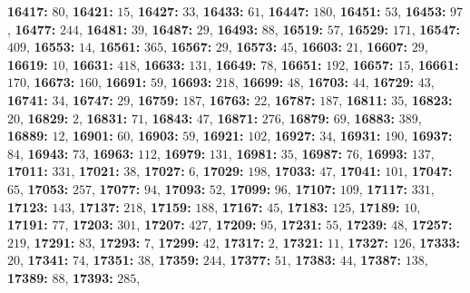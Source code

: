 \textsf{\bfseries 16417:} $80$, \textsf{\bfseries 16421:} $15$, \textsf{\bfseries 16427:} $33$, \textsf{\bfseries 16433:} $61$, \textsf{\bfseries 16447:} $180$, \textsf{\bfseries 16451:} $53$, \textsf{\bfseries 16453:} $97$, \textsf{\bfseries 16477:} $244$, \textsf{\bfseries 16481:} $39$, \textsf{\bfseries 16487:} $29$, \textsf{\bfseries 16493:} $88$, \textsf{\bfseries 16519:} $57$, \textsf{\bfseries 16529:} $171$, \textsf{\bfseries 16547:} $409$, \textsf{\bfseries 16553:} $14$, \textsf{\bfseries 16561:} $365$, \textsf{\bfseries 16567:} $29$, \textsf{\bfseries 16573:} $45$, \textsf{\bfseries 16603:} $21$, \textsf{\bfseries 16607:} $29$, \textsf{\bfseries 16619:} $10$, \textsf{\bfseries 16631:} $418$, \textsf{\bfseries 16633:} $131$, \textsf{\bfseries 16649:} $78$, \textsf{\bfseries 16651:} $192$, \textsf{\bfseries 16657:} $15$, \textsf{\bfseries 16661:} $170$, \textsf{\bfseries 16673:} $160$, \textsf{\bfseries 16691:} $59$, \textsf{\bfseries 16693:} $218$, \textsf{\bfseries 16699:} $48$, \textsf{\bfseries 16703:} $44$, \textsf{\bfseries 16729:} $43$, \textsf{\bfseries 16741:} $34$, \textsf{\bfseries 16747:} $29$, \textsf{\bfseries 16759:} $187$, \textsf{\bfseries 16763:} $22$, \textsf{\bfseries 16787:} $187$, \textsf{\bfseries 16811:} $35$, \textsf{\bfseries 16823:} $20$, \textsf{\bfseries 16829:} $2$, \textsf{\bfseries 16831:} $71$, \textsf{\bfseries 16843:} $47$, \textsf{\bfseries 16871:} $276$, \textsf{\bfseries 16879:} $69$, \textsf{\bfseries 16883:} $389$, \textsf{\bfseries 16889:} $12$, \textsf{\bfseries 16901:} $60$, \textsf{\bfseries 16903:} $59$, \textsf{\bfseries 16921:} $102$, \textsf{\bfseries 16927:} $34$, \textsf{\bfseries 16931:} $190$, \textsf{\bfseries 16937:} $84$, \textsf{\bfseries 16943:} $73$, \textsf{\bfseries 16963:} $112$, \textsf{\bfseries 16979:} $131$, \textsf{\bfseries 16981:} $35$, \textsf{\bfseries 16987:} $76$, \textsf{\bfseries 16993:} $137$, \textsf{\bfseries 17011:} $331$, \textsf{\bfseries 17021:} $38$, \textsf{\bfseries 17027:} $6$, \textsf{\bfseries 17029:} $198$, \textsf{\bfseries 17033:} $47$, \textsf{\bfseries 17041:} $101$, \textsf{\bfseries 17047:} $65$, \textsf{\bfseries 17053:} $257$, \textsf{\bfseries 17077:} $94$, \textsf{\bfseries 17093:} $52$, \textsf{\bfseries 17099:} $96$, \textsf{\bfseries 17107:} $109$, \textsf{\bfseries 17117:} $331$, \textsf{\bfseries 17123:} $143$, \textsf{\bfseries 17137:} $218$, \textsf{\bfseries 17159:} $188$, \textsf{\bfseries 17167:} $45$, \textsf{\bfseries 17183:} $125$, \textsf{\bfseries 17189:} $10$, \textsf{\bfseries 17191:} $77$, \textsf{\bfseries 17203:} $301$, \textsf{\bfseries 17207:} $427$, \textsf{\bfseries 17209:} $95$, \textsf{\bfseries 17231:} $55$, \textsf{\bfseries 17239:} $48$, \textsf{\bfseries 17257:} $219$, \textsf{\bfseries 17291:} $83$, \textsf{\bfseries 17293:} $7$, \textsf{\bfseries 17299:} $42$, \textsf{\bfseries 17317:} $2$, \textsf{\bfseries 17321:} $11$, \textsf{\bfseries 17327:} $126$, \textsf{\bfseries 17333:} $20$, \textsf{\bfseries 17341:} $74$, \textsf{\bfseries 17351:} $38$, \textsf{\bfseries 17359:} $244$, \textsf{\bfseries 17377:} $51$, \textsf{\bfseries 17383:} $44$, \textsf{\bfseries 17387:} $138$, \textsf{\bfseries 17389:} $88$, \textsf{\bfseries 17393:} $285$, 
